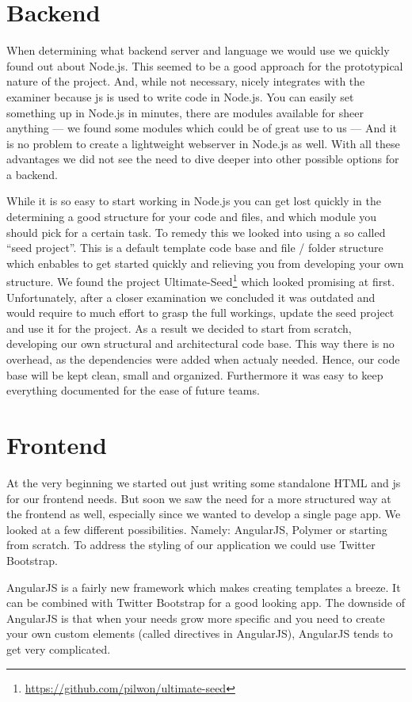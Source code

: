 \section{Backend}
When determining what backend server and language we would use
we quickly found out about Node.js.
This seemed to be a good approach for the prototypical nature of the project.
And, while not necessary, nicely integrates with the \gls{examiner}
because \gls{js} is used to write code in Node.js.
You can easily set something up in Node.js in minutes,
there are modules available for sheer anything
--- we found some modules which could be of great use to us ---
And it is no problem to create a lightweight webserver in Node.js as well.
With all these advantages we did not see the need
to dive deeper into other possible options for a backend.

While it is so easy to start working in Node.js
you can get lost quickly in the determining a good structure
for your code and files,
and which module you should pick for a certain task.
To remedy this we looked into using a so called ``seed project''.
This is a default template code base and file / folder structure which enbables
to get started quickly and relieving you from developing your own structure.
We found the project
Ultimate-Seed\footnote{\url{https://github.com/pilwon/ultimate-seed}}
which looked promising at first.
Unfortunately, after a closer examination we concluded it was outdated
and would require to much effort to grasp the full workings,
update the seed project and use it for the \gls{project}.
As a result we decided to start from scratch,
developing our own structural and architectural code base.
This way there is no overhead, as the dependencies were added when actualy 
needed. Hence, our code base will be kept clean, small and organized.
Furthermore it was easy to keep everything documented for the ease of future 
teams.

\section{Frontend}
At the very beginning we started out
just writing some standalone HTML and \gls{js} for our frontend needs.
But soon we saw the need for a more structured way at the frontend as well,
especially since we wanted to develop a single page app.
We looked at a few different possibilities.
Namely: AngularJS, Polymer or starting from scratch.
To address the styling of our application we could use Twitter Bootstrap.

AngularJS is a fairly new framework which makes creating templates a breeze.
It can be combined with Twitter Bootstrap for a good looking app.
The downside of AngularJS is that when your needs grow more specific
and you need to create your own custom elements
(called directives in AngularJS),
AngularJS tends to get very complicated.

